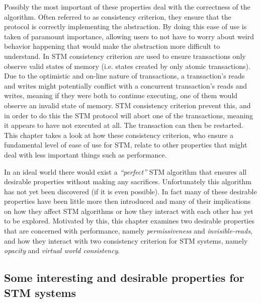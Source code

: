 Possibly the most important of these properties deal with the correctness of the algorithm.
Often referred to as consistency criterion, they ensure that the protocol is correctly implementing
the abstraction.
By doing this ease of use is taken of paramount importance, allowing users to not have to worry about weird behavior happening that would make
the abstraction more difficult to understand.
In STM consistency criterion are used to ensure transactions only observe valid states of
memory (i.e. states created by only atomic transactions).
Due to the optimistic and on-line nature of transactions, a transaction's reads and writes
might potentially conflict with a concurrent transaction's reads and writes, meaning
if they were both to continue executing, one of them would observe an invalid state of memory.
STM consistency criterion prevent this, and in order to do this the STM protocol will abort
one of the transactions, meaning it appears to have not executed at all.
The transaction can then be restarted.
This chapter takes a look at how these consistency criterion, who ensure a fundamental level of ease of use
for STM, relate to other properties that might deal with less important things such as performance.



In an ideal world there would exist a \emph{``perfect''} STM algorithm that ensures all desirable properties
without making any sacrifices.
Unfortunately this algorithm has not yet been discovered (if it is even possible).
In fact many of these desirable properties have been little more then introduced and many of their implications
on how they affect STM algorithms or how they interact with each other has yet to be explored.
Motivated by this, this chapter examines two desirable properties that are concerned with performance,
namely \emph{permissiveness} and \emph{invisible-reads}, and how they interact with two consistency
criterion for STM systems, namely \emph{opacity} and \emph{virtual world consistency}.


\subsection{Some interesting and desirable properties for STM systems} \label{sec:def-perm}

